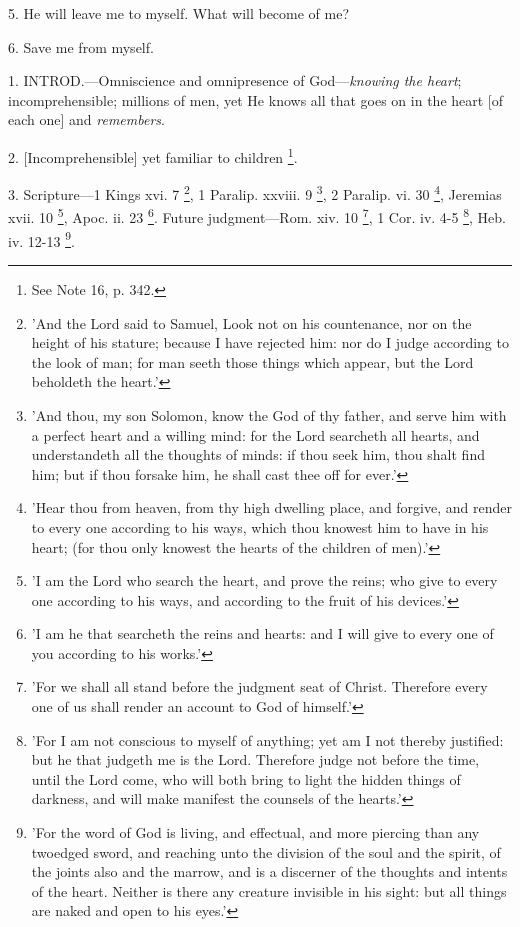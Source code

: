 5. He will leave me to myself. What will become
of me?

6. Save me from myself.


1. INTROD.—Omniscience
and omnipresence of God—\emph{knowing the heart}; incomprehensible;
millions of men, yet He knows all that goes on in the heart [of
each one] and \emph{remembers}.

2. [Incomprehensible] yet familiar to children \footnote{See Note
16, p. 342.}.

3. Scripture—1 Kings xvi. 7 \footnote{'And the Lord said to
Samuel, Look not on his countenance, nor on the height of his stature;
because I have rejected him: nor do I judge according to the look of
man; for man seeth those things which appear, but the Lord beholdeth
the heart.'}, 1 Paralip. xxviii. 9 \footnote{'And thou, my son
Solomon, know the God of thy father, and serve him with a perfect
heart and a willing mind: for the Lord searcheth all hearts, and
understandeth all the thoughts of minds: if thou seek him, thou shalt
find him; but if thou forsake him, he shall cast thee off for ever.'}, 2 Paralip. vi. 30 \footnote{'Hear thou from heaven,
from thy high dwelling place, and forgive, and render to every one
according to his ways, which thou knowest him to have in his heart;
(for thou only knowest the hearts of the children of men).'},
Jeremias xvii. 10 \footnote{'I am the Lord who
search the heart, and prove the reins; who give to every one according
to his ways, and according to the fruit of his devices.'},
Apoc. ii. 23 \footnote{'I am he that searcheth
the reins and hearts: and I will give to every one of you according to
his works.'}. Future
judgment—Rom. xiv. 10 \footnote{'For we shall all stand
before the judgment seat of Christ. Therefore every one of us shall
render an account to God of himself.'},
1 Cor. iv. 4-5 \footnote{'For I am not conscious
to myself of anything; yet am I not thereby justified: but he that
judgeth me is the Lord. Therefore judge not before the time, until the
Lord come, who will both bring to light the hidden things of darkness,
and will make manifest the counsels of the hearts.'}, Heb.
iv. 12-13 \footnote{'For the word of God is
living, and effectual, and more piercing than any twoedged sword, and
reaching unto the division of the soul and the spirit, of the joints
also and the marrow, and is a discerner of the thoughts and intents of
the heart. Neither is there any creature invisible in his sight: but
all things are naked and open to his eyes.'}.

